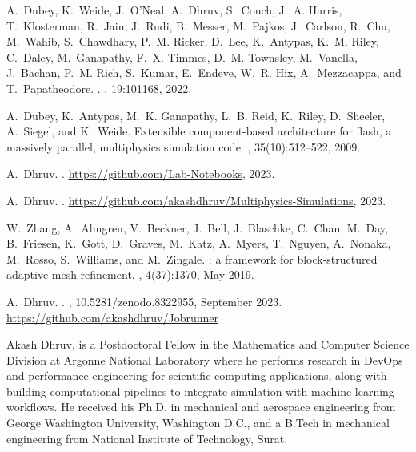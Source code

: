 \documentclass{IEEEcsmag}
\begin{document}
\begin{thebibliography}{1}

A.~Dubey, K.~Weide, J.~O’Neal, A.~Dhruv, S.~Couch, J.~A. Harris,
  T.~Klosterman, R.~Jain, J.~Rudi, B.~Messer, M.~Pajkos, J.~Carlson, R.~Chu,
  M.~Wahib, S.~Chawdhary, P.~M. Ricker, D.~Lee, K.~Antypas, K.~M. Riley,
  C.~Daley, M.~Ganapathy, F.~X. Timmes, D.~M. Townsley, M.~Vanella, J.~Bachan,
  P.~M. Rich, S.~Kumar, E.~Endeve, W.~R. Hix, A.~Mezzacappa, and
  T.~Papatheodore.
.
, 19:101168, 2022.

A.~Dubey, K.~Antypas, M.~K. Ganapathy, L.~B. Reid, K.~Riley, D.~Sheeler,
  A.~Siegel, and K.~Weide.
\newblock Extensible component-based architecture for flash, a massively
  parallel, multiphysics simulation code.
, 35(10):512--522, 2009.

A.~Dhruv.
.
\newblock \url{https://github.com/Lab-Notebooks}, 2023.

A.~Dhruv.
.
\newblock \url{https://github.com/akashdhruv/Multiphysics-Simulations}, 2023.

W.~Zhang, A.~Almgren, V.~Beckner, J.~Bell, J.~Blaschke, C.~Chan, M.~Day,
  B.~Friesen, K.~Gott, D.~Graves, M.~Katz, A.~Myers, T.~Nguyen, A.~Nonaka,
  M.~Rosso, S.~Williams, and M.~Zingale.
: a framework for block-structured adaptive mesh refinement.
, 4(37):1370, May 2019.


A.~Dhruv.
.
, 10.5281/zenodo.8322955, September 2023.
\newblock \url{https://github.com/akashdhruv/Jobrunner}



\end{thebibliography}

\begin{IEEEbiography}{Akash Dhruv,} is a Postdoctoral Fellow in the Mathematics and Computer Science Division at Argonne National Laboratory where he performs research in DevOps and performance engineering for scientific computing applications, along with building computational pipelines to integrate simulation with machine learning workflows. He received his Ph.D. in mechanical and aerospace engineering from George Washington University, Washington D.C., and a B.Tech in mechanical engineering from National Institute of Technology, Surat. \vspace*{8pt}
\end{IEEEbiography}
\end{document}
